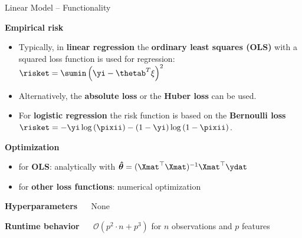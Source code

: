 \documentclass[11pt,compress,t,notes=noshow, xcolor=table]{beamer}
\newcommand{\highlight}[1]{\textcolor{highlightcol}{\textbf{#1}}}
\begin{document}
\begin{frame}{Linear Model -- Functionality}

\footnotesize

\highlight{Empirical risk}
\begin{itemize}\footnotesize
  \item Typically, in \textbf{linear regression} the \textbf{ordinary least squares (OLS)} with a squared loss function is used for regression: $\risket  = \sumin \left(\yi - \thetab^T \xi\right)^2$
    
   \item Alternatively, the \textbf{absolute loss} or the \textbf{Huber loss} can be used. %
  
  \item For \textbf{logistic regression} the risk function is based on the \textbf{Bernoulli loss} $\risket = -\yi \log \left(\pixii\right) - (1 - \yi) \log \left(1 - \pixii \right)$.
  


\end{itemize}

\footnotesize

\medskip

\highlight{Optimization}
\begin{itemize}\footnotesize
  \item for \textbf{OLS}: analytically with $\bm{\hat \theta} = (\Xmat^\top \Xmat)^{-1} \Xmat^\top\ydat$
  \item for \textbf{other loss functions}: numerical optimization 
\end{itemize}

\medskip

\highlight{Hyperparameters} ~~ None

\medskip

\highlight{Runtime behavior} ~~ $\mathcal{O}(p^2 \cdot n + p^3)$ for $n$ 
observations and $p$ features

\end{frame}

\end{document}
